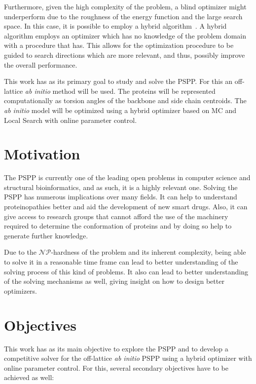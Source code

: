 Furthermore, given the high complexity of the problem, a blind optimizer might
underperform due to the roughness of the energy function and the large
search space. In this case, it is possible to employ a hybrid
algorithm~\cite{blum2011hybrid}. A hybrid algorithm employs an optimizer which has no
knowledge of the problem domain with a procedure that has. This allows for the
optimization procedure to be guided to search directions which are more
relevant, and thus, possibly improve the overall performance.

This work has as its primary goal to study and solve the \ac{PSPP}. For this an
off-lattice \textit{ab initio} method will be used. The proteins will be
represented computationally as torsion angles of the backbone and side chain
centroids. The \textit{ab initio} model will be optimized using a hybrid
optimizer based on \ac{MC} and Local Search with online parameter control.


\section{Motivation}\label{sec:chap1_motivation}

The \ac{PSPP} is currently one of the leading open problems in computer science and
structural bioinformatics, and as such, it is a highly relevant one. Solving
the \ac{PSPP} has numerous implications over many fields. It can help to understand
proteinopathies better and aid the development of new smart drugs.
Also, it can give access to research groups that cannot afford the use of the
machinery required to determine the conformation of proteins and by doing so
help to generate further knowledge.

Due to the $\mathcal{NP}$-hardness of the problem and its inherent complexity,
being able to solve it in a reasonable time frame can lead to better
understanding of the solving process of this kind of problems. It also can lead
to better understanding of the solving mechanisms as well, giving insight on
how to design better optimizers.

\section{Objectives}\label{sec:chap1_objectives}

This work has as its main objective to explore the \ac{PSPP} and to develop a
competitive solver for the off-lattice \textit{ab initio} \ac{PSPP} using a
hybrid optimizer with online parameter control. For this, several secondary
objectives have to be achieved as well:

